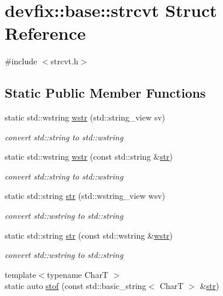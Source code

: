 \hypertarget{structdevfix_1_1base_1_1strcvt}{}\section{devfix\+:\+:base\+:\+:strcvt Struct Reference}
\label{structdevfix_1_1base_1_1strcvt}


{\ttfamily \#include $<$strcvt.\+h$>$}

\subsection*{Static Public Member Functions}
\begin{DoxyCompactItemize}
\item 
static std\+::wstring \hyperlink{structdevfix_1_1base_1_1strcvt_aa7148029839299a29e74e422fdb48567}{wstr} (std\+::string\+\_\+view sv)
\begin{DoxyCompactList}\small\item\em convert std\+::string to std\+::wstring \end{DoxyCompactList}\item 
static std\+::wstring \hyperlink{structdevfix_1_1base_1_1strcvt_acc5ba74410abd732c4559800b1ff2852}{wstr} (const std\+::string \&\hyperlink{structdevfix_1_1base_1_1strcvt_a22dadaf95d340097e76fb077898578a7}{str})
\begin{DoxyCompactList}\small\item\em convert std\+::string to std\+::wstring \end{DoxyCompactList}\item 
static std\+::string \hyperlink{structdevfix_1_1base_1_1strcvt_a22dadaf95d340097e76fb077898578a7}{str} (std\+::wstring\+\_\+view wsv)
\begin{DoxyCompactList}\small\item\em convert std\+::wstring to std\+::string \end{DoxyCompactList}\item 
static std\+::string \hyperlink{structdevfix_1_1base_1_1strcvt_a721e180085ba30dbdb37ac878d75d350}{str} (const std\+::wstring \&\hyperlink{structdevfix_1_1base_1_1strcvt_aa7148029839299a29e74e422fdb48567}{wstr})
\begin{DoxyCompactList}\small\item\em convert std\+::wstring to std\+::string \end{DoxyCompactList}\item 
{\footnotesize template$<$typename CharT $>$ }\\static auto \hyperlink{structdevfix_1_1base_1_1strcvt_a5b28d529cfbbf026c8e1550e92e2e557}{stof} (const std\+::basic\+\_\+string$<$ CharT $>$ \&\hyperlink{structdevfix_1_1base_1_1strcvt_a22dadaf95d340097e76fb077898578a7}{str})

\end{DoxyCompactItemize}
